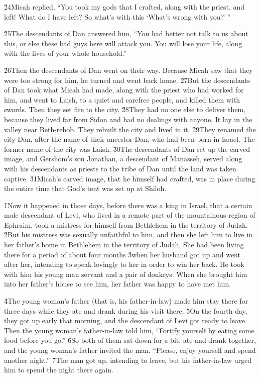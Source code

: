 \v{24}Micah replied, ``You took my gods that I crafted, along with the priest, and left! What do I have left? So what's with this `What's wrong with you?'\,''

\v{25}The descendants of Dan answered him, ``You had better not talk to us about this, or else these bad guys here will attack you. You will lose your life, along with the lives of your whole household.''

\v{26}Then the descendants of Dan went on their way. Because Micah saw that they were too strong for him, he turned and went back home. \v{27}But the descendants of Dan took what Micah had made, along with the priest who had worked for him, and went to Laish, to a quiet and carefree people, and killed them with swords. Then they set fire to the city. \v{28}They had no one else to deliver them, because they lived far from Sidon and had no dealings with anyone. It lay in the valley near Beth-rehob. They rebuilt the city and lived in it. \v{29}They renamed the city Dan, after the name of their ancestor Dan, who had been born in Israel. The former name of the city was Laish. \v{30}The descendants of Dan set up the carved image, and Gershom's son Jonathan, a descendant of Manasseh, served along with his descendants as priests to the tribe of Dan until the land was taken captive. \v{31}Micah's carved image, that he himself had crafted, was in place during the entire time that God's tent was set up at Shiloh.

\v{1}Now it happened in those days, before there was a king in Israel, that a certain male descendant of Levi, who lived in a remote part of the mountainous region of Ephraim, took a mistress for himself from Bethlehem in the territory of Judah. \v{2}But his mistress was sexually unfaithful to him, and then she left him to live in her father's home in Bethlehem in the territory of Judah. She had been living there for a period of about four months \v{3}when her husband got up and went after her, intending to speak lovingly to her in order to win her back. He took with him his young man servant and a pair of donkeys. When she brought him into her father's house to see him, her father was happy to have met him.

\v{4}The young woman's father (that is, his father-in-law) made him stay there for three days while they ate and drank during his visit there. \v{5}On the fourth day, they got up early that morning, and the descendant of Levi got ready to leave. Then the young woman's father-in-law told him, ``Fortify yourself by eating some food before you go.'' \v{6}So both of them sat down for a bit, ate and drank together, and the young woman's father invited the man, ``Please, enjoy yourself and spend another night.'' \v{7}The man got up, intending to leave, but his father-in-law urged him to spend the night there again.

